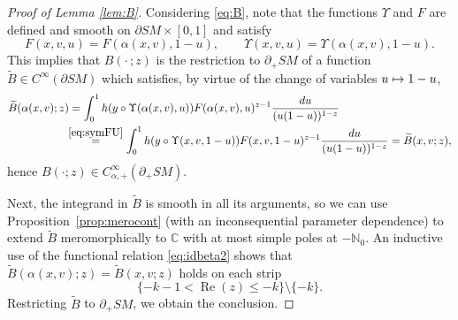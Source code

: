 \documentclass[JEP,XML,SOM,Unicode,NoFloatCountersInSection, NoEqCountersInSection,published]{cedram}
\let\backslash\setminus
\def\mto{\mathchoice{\longmapsto}{\mapsto}{\mapsto}{\mapsto}}
\DeclareMathOperator{\Real}{Re}
\theoremstyle{plain}
\theoremstyle{definition}
\theoremstyle{remark}
\def\Cm{{\mathbb{C}}}
\def\Nm{{\mathbb{N}}}
\newcommand{\wtB}{\widetilde{B}}
\begin{document}
 \label{sec:BetaFacts}

\begin{proof}[Proof of Lemma \ref{lem:B}] Considering \eqref{eq:B}, note that the functions $\Upsilon$ and $F$ are defined
and smooth on $\partial SM\times [0,1]$ and satisfy
\begin{equation}
F(x,v,u) = F(\alpha(x,v),1-u), \qquad \Upsilon (x,v,u) = \Upsilon (\alpha(x,v),1-u).
\label{eq:symFU}
\end{equation}
This implies that $B(\cdot\,; z)$ is the restriction to $\partial_+ SM$ of a function $\wtB\in C^\infty(\partial SM)$ which satisfies,
by virtue of the change of variables $u \mto 1-u$,
\begin{align*}
\wtB(\alpha(x,v); z) &= \int_0^1 h(y\circ\Upsilon(\alpha(x,v),u)) F(\alpha(x,v),u)^{z-1} \frac{du}{(u(1-u))^{1-z}} \\
&\!\!\stackrel{\eqref{eq:symFU}}{=} \int_0^1 h(y\circ\Upsilon(x,v,1-u)) F(x,v,1-u)^{z-1} \frac{du}{ (u(1-u))^{1-z}} = \wtB(x,v; z),
\end{align*}
hence $B(\cdot; z) \in C_{\alpha,+}^\infty(\partial_+ SM)$.

Next, the integrand in $\wtB$ is smooth in all its arguments, so we can use Proposition~\ref{prop:merocont} (with an
inconsequential parameter dependence) to extend $\wtB$ meromorphically to $\Cm$ with at most simple poles at $-\Nm_0$.
An inductive use of the functional relation \eqref{eq:idbeta2} shows that $\wtB(\alpha(x,v); z) = \wtB(x,v; z)$ holds on each strip
\[
\{-k-1<\Real(z)\le -k\}\backslash \{-k\}.
\]
Restricting $\wtB$ to $\partial_+ SM$, we obtain the conclusion.
\end{proof}
\end{document}
